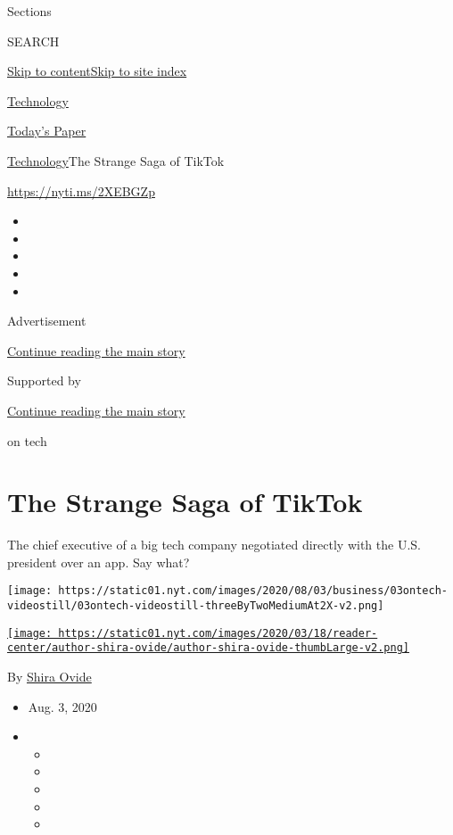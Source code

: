 Sections

SEARCH

\protect\hyperlink{site-content}{Skip to
content}\protect\hyperlink{site-index}{Skip to site index}

\href{https://www.nytimes.com/section/technology}{Technology}

\href{https://myaccount.nytimes.com/auth/login?response_type=cookie\&client_id=vi}{}

\href{https://www.nytimes.com/section/todayspaper}{Today's Paper}

\href{/section/technology}{Technology}\textbar{}The Strange Saga of
TikTok

\href{https://nyti.ms/2XEBGZp}{https://nyti.ms/2XEBGZp}

\begin{itemize}
\item
\item
\item
\item
\item
\end{itemize}

Advertisement

\protect\hyperlink{after-top}{Continue reading the main story}

Supported by

\protect\hyperlink{after-sponsor}{Continue reading the main story}

on tech

\hypertarget{the-strange-saga-of-tiktok}{%
\section{The Strange Saga of TikTok}\label{the-strange-saga-of-tiktok}}

The chief executive of a big tech company negotiated directly with the
U.S. president over an app. Say what?

\texttt{[image: https://static01.nyt.com/images/2020/08/03/business/03ontech-videostill/03ontech-videostill-threeByTwoMediumAt2X-v2.png]}

\href{https://www.nytimes.com/by/shira-ovide}{\texttt{[image: https://static01.nyt.com/images/2020/03/18/reader-center/author-shira-ovide/author-shira-ovide-thumbLarge-v2.png]}}

By \href{https://www.nytimes.com/by/shira-ovide}{Shira Ovide}

\begin{itemize}
\item
  Aug. 3, 2020
\item
  \begin{itemize}
  \item
  \item
  \item
  \item
  \item
  \end{itemize}
\end{itemize}

